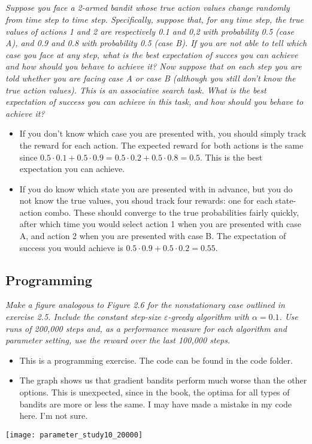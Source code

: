 \documentclass{article}
\begin{document}
\subsection{}
\textit{Suppose you face a 2-armed bandit whose true action values change randomly from time step to time step. Specifically, suppose that, for any time step, the true values of actions 1 and 2 are respectively 0.1 and 0,2 with probability 0.5 (case A), and 0.9 and 0.8 with probability 0.5 (case B). If you are not able to tell which case you face at any step, what is the best expectation of succes you can achieve and how should you behave to achieve it?  Now suppose that on each step you are told whether you are facing case A or case B (although you still don't know the true action values). This is an associative search task. What is the best expectation of success you can achieve in this task, and how should you behave to achieve it?}
\begin{itemize}
\item If you don't know which case you are presented with, you should simply track the reward for each action. The expected reward for both actions is the same since $0.5 \cdot 0.1 + 0.5 \cdot 0.9 = 0.5 \cdot 0.2 + 0.5 \cdot 0.8 = 0.5$. This is the best expectation you can achieve.
\item If you do know which state you are presented with in advance, but you do not know the true values, you shoud track four rewards: one for each state-action combo. These should converge to the true probabilities fairly quickly, after which time you would select action 1 when you are presented with case A, and action 2 when you are presented with case B. The expectation of success you would achieve is $0.5 \cdot 0.9 + 0.5 \cdot 0.2 = 0.55$.
\end{itemize}

\subsection{Programming}
\textit{Make a figure analogous to Figure 2.6 for the nonstationary case outlined in exercise 2.5. Include the constant step-size $\varepsilon$-greedy algorithm with $\alpha = 0.1$. Use runs of 200,000 steps and, as a performance measure for each algorithm and parameter setting, use the reward over the last 100,000 steps.}
\begin{itemize}
\item This is a programming exercise. The code can be found in the code folder. 
\item The graph shows us that gradient bandits perform much worse than the other options. This is unexpected, since in the book, the optima for all types of bandits are more or less the same. I may have made a mistake in my code here. I'm not sure.
\end{itemize}
\texttt{[image: parameter\_study10\_20000]}
\end{document}
